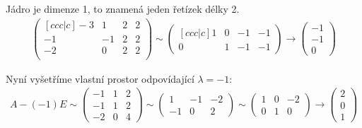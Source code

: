 \documentclass[]{article}
\begin{document}
\medskip
\medskip

Jádro je dimenze 1, to znamená jeden řetízek délky 2.
\begin{align*}
    \begin{pmatrix}[ccc|c]
        -3 & 1 & 2 & 2 \\
        -1 &-1 & 2 & 2 \\
        -2 & 0 & 2 & 2 \\
    \end{pmatrix}
    \sim
    \begin{pmatrix}[ccc|c]
        1 & 0 & -1 & -1 \\
        0 & 1 & -1 & -1
    \end{pmatrix}
    \rightarrow
    \begin{pmatrix}
        -1 \\ -1 \\ 0
    \end{pmatrix}
\end{align*}

\medskip
\medskip

Nyní vyšetříme vlastní prostor odpovídající $\lambda=-1$:
\begin{align*}
    A - (-1)E
    \sim
    \begin{pmatrix}
        -1 & 1 & 2 \\
        -1 & 1 & 2 \\
        -2 & 0 & 4
    \end{pmatrix}
    \sim
    \begin{pmatrix}
        1 & -1 & -2 \\
        -1 & 0 & 2
    \end{pmatrix}
    \sim
    \begin{pmatrix}
        1 & 0 & -2 \\
        0 & 1 & 0
    \end{pmatrix}
    \rightarrow
    \begin{pmatrix}
        2 \\ 0 \\ 1
    \end{pmatrix}
\end{align*}

\medskip
\medskip
\end{document}

